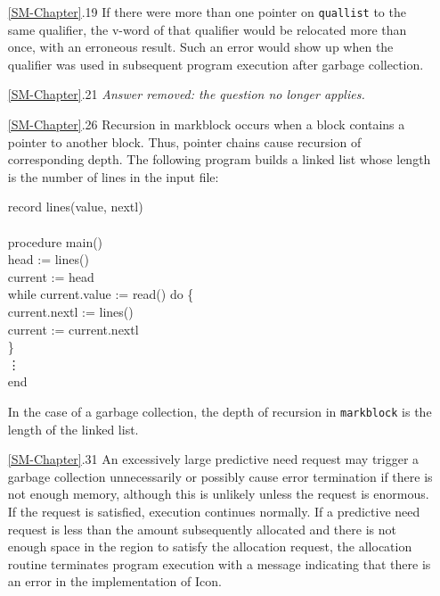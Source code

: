 \begin{itemize}
\goodbreak\item[\ref*{SM-Chapter}.19]
If there were more than one pointer on \texttt{quallist} to the same qualifier, the
v-word of that qualifier would be relocated more than once, with an
erroneous result. Such an error would show up when the qualifier was
used in subsequent program execution after garbage collection.

\goodbreak\item[\ref*{SM-Chapter}.21]
{\em Answer removed: the question no longer applies.}

\goodbreak\item[\ref*{SM-Chapter}.26]
Recursion in markblock occurs when a block contains a pointer to another
block. Thus, pointer chains cause recursion of corresponding depth. The
following program builds a linked list whose length is the number of lines
in the input file:
\begin{iconcode}
record lines(value, nextl)\\
\\
procedure main()\\
\>head := lines()\\
\>current := head\\
\>while current.value := read() do \{\\
\>\>current.nextl := lines()\\
\>\>current := current.nextl\\
\>\}\\
\>\>\vdots\\
end
\end{iconcode}
In the case of a garbage collection, the depth of recursion in \texttt{markblock}
is the length of the linked list.

\goodbreak\item[\ref*{SM-Chapter}.31]
An excessively large predictive need request may trigger a garbage collection
unnecessarily or possibly cause error termination if there is not
enough memory, although this is unlikely unless the request is enormous.
If the request is satisfied, execution continues normally. If a predictive
need request is less than the amount subsequently allocated and there is
not enough space in the region to satisfy the allocation request, the allocation
routine terminates program execution with a message indicating that
there is an error in the implementation of Icon.


\end{itemize}

